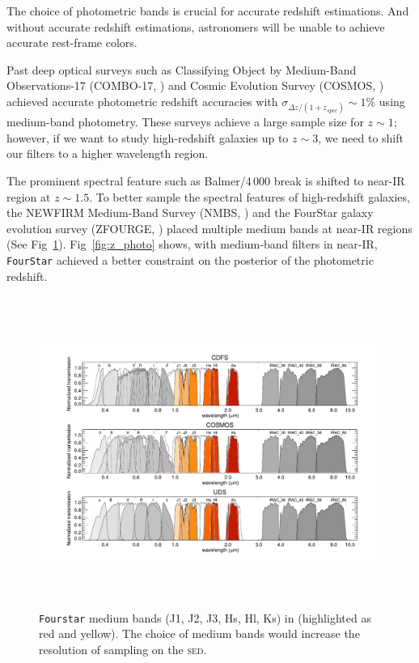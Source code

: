 \documentclass{ar-1col}
\begin{document}
The choice of photometric bands is crucial for accurate redshift estimations. 
And without accurate redshift estimations, astronomers will be unable to achieve accurate rest-frame colors.

Past deep optical surveys such as Classifying Object by Medium-Band Observations-17 (COMBO-17, \citet{Wolf2003}) and Cosmic Evolution Survey (COSMOS, \citet{Scoville2007}) achieved accurate photometric redshift accuracies with $ \sigma_{\Delta z / (1 + z_{spec})} \sim 1\% $ using medium-band photometry.
These surveys achieve a large sample size for $ z \sim 1 $; however, if we want to study high-redshift galaxies up to $ z \sim 3 $, we need to shift our filters to a higher wavelength region. 

The prominent spectral feature such as Balmer/4\,000 break is shifted to near-IR region at $ z \sim 1.5 $.
To better sample the spectral features of high-redshift galaxies, the NEWFIRM Medium-Band Survey (NMBS, \citet{Whitaker2011}) and the FourStar galaxy evolution survey (ZFOURGE, \citet{Straatman2016}) placed multiple medium bands at near-IR regions (See Fig~\ref{fig:medium_bands}).
Fig~\ref{fig:z_photo} shows, with medium-band filters in near-IR, \texttt{FourStar} achieved a better constraint on the posterior of the photometric redshift. 


\begin{figure}
    \includegraphics[width=6in, height=4in]{images/medium_bands.pdf}
    \caption{\texttt{Fourstar} medium bands (J1, J2, J3, Hs, Hl, Ks) in \citet{Straatman2016} (highlighted as red and yellow). The choice of medium bands would increase the resolution of sampling on the \textsc{sed}.}
    \label{fig:medium_bands}
\end{figure}
\end{document}
